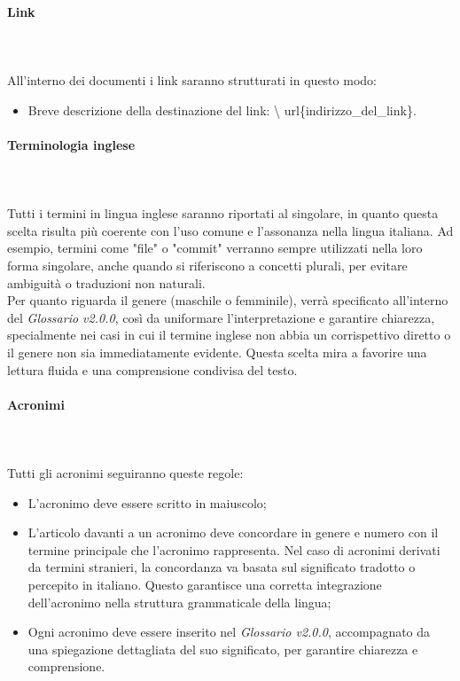 \paragraph{Link}
~\\\\All'interno dei documenti i link saranno strutturati in questo modo:
\begin{itemize}
      \item Breve descrizione della destinazione del link: \textbackslash
            url\{indirizzo\_del\_link\}.
\end{itemize}
\paragraph{Terminologia inglese}
~\\\\Tutti i termini in lingua inglese saranno riportati al singolare, in quanto
questa scelta risulta più coerente con l'uso comune e l'assonanza nella lingua
italiana. Ad esempio, termini come "file" o "commit" verranno sempre utilizzati
nella loro forma singolare, anche quando si riferiscono a concetti plurali, per
evitare ambiguità o traduzioni non naturali.\\ Per quanto riguarda il genere
(maschile o femminile), verrà specificato all'interno del \textit{Glossario v2.0.0},
così da uniformare l'interpretazione e garantire chiarezza, specialmente nei
casi in cui il termine inglese non abbia un corrispettivo diretto o il genere
non sia immediatamente evidente. Questa scelta mira a favorire una lettura
fluida e una comprensione condivisa del testo.
\paragraph{Acronimi}
~\\\\Tutti gli acronimi seguiranno queste regole:
\begin{itemize}
      \item L'acronimo deve essere scritto in maiuscolo;
      \item L'articolo davanti a un acronimo deve concordare in genere e numero con il
            termine principale che l'acronimo rappresenta. Nel caso di acronimi derivati da
            termini stranieri, la concordanza va basata sul significato tradotto o
            percepito in italiano. Questo garantisce una corretta integrazione
            dell'acronimo nella struttura grammaticale della lingua;
      \item Ogni acronimo deve essere inserito nel \textit{Glossario v2.0.0}, accompagnato da una
            spiegazione dettagliata del suo significato, per garantire chiarezza e
            comprensione.
\end{itemize}
